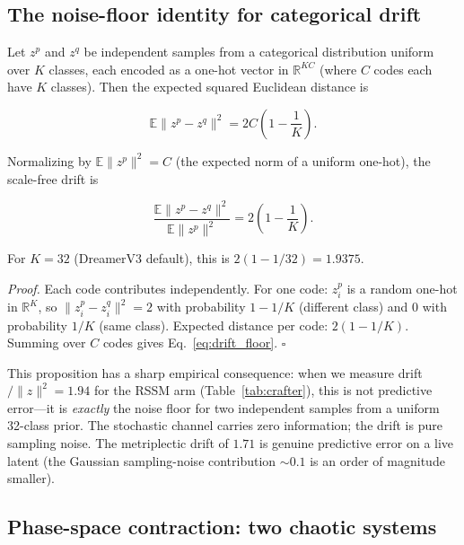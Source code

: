 \subsection{The noise-floor identity for categorical drift}

\begin{proposition}\label{prop:drift}
Let $z^p$ and $z^q$ be independent samples from a categorical distribution
uniform over $K$ classes, each encoded as a one-hot vector in
$\mathbb{R}^{KC}$ (where $C$ codes each have $K$ classes). Then the
expected squared Euclidean distance is

\begin{equation}\label{eq:drift_floor}
  \mathbb{E}\|z^p - z^q\|^2 = 2C\left(1 - \frac{1}{K}\right).
\end{equation}

Normalizing by $\mathbb{E}\|z^p\|^2 = C$ (the expected norm of a uniform
one-hot), the scale-free drift is

\begin{equation}\label{eq:drift_norm_floor}
  \frac{\mathbb{E}\|z^p - z^q\|^2}{\mathbb{E}\|z^p\|^2}
  = 2\left(1 - \frac{1}{K}\right).
\end{equation}

For $K = 32$ (DreamerV3 default), this is $2(1 - 1/32) = 1.9375$.
\end{proposition}

\textit{Proof.} Each code contributes independently. For one code:
$z^p_i$ is a random one-hot in $\mathbb{R}^K$, so
$\|z^p_i - z^q_i\|^2 = 2$ with probability $1 - 1/K$ (different class)
and $0$ with probability $1/K$ (same class). Expected distance per code:
$2(1-1/K)$. Summing over $C$ codes gives Eq.~\eqref{eq:drift_floor}.
\hfill$\square$

This proposition has a sharp empirical consequence: when we measure
drift$/\|z\|^2 = 1.94$ for the RSSM arm (Table~\ref{tab:crafter}), this
is not predictive error---it is \emph{exactly} the noise floor for two
independent samples from a uniform 32-class prior. The stochastic channel
carries zero information; the drift is pure sampling noise. The
metriplectic drift of $1.71$ is genuine predictive error on a live latent
(the Gaussian sampling-noise contribution $\sim 0.1$ is an order of
magnitude smaller).

\subsection{Phase-space contraction: two chaotic systems}

